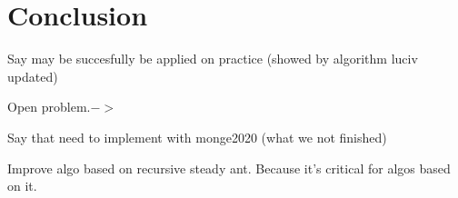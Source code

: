 \section*{Conclusion}
\label{section:conclusion}

Say may be succesfully be applied on practice (showed by algorithm luciv updated)


Open problem.$->$

Say that need to implement with monge2020 (what we not finished)

Improve algo based on recursive steady ant. Because it's critical for algos based on it.
